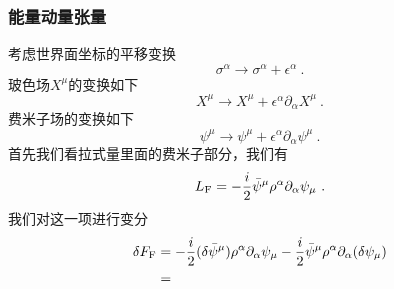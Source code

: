 \subsubsection{能量动量张量}
考虑世界面坐标的平移变换
\begin{equation}
\sigma^\alpha \rightarrow \sigma^\alpha + \epsilon^\alpha~.
\end{equation}
玻色场$X^\mu$的变换如下
\begin{equation}
X^\mu \rightarrow X^\mu + \epsilon^\alpha \partial_\alpha X^\mu ~.
\end{equation}
费米子场的变换如下
\begin{equation}
\psi^\mu \rightarrow \psi^\mu + \epsilon^\alpha \partial_\alpha \psi^\mu ~.
\end{equation}
首先我们看拉式量里面的费米子部分，我们有
\begin{equation}
L_{\rm F} = - \frac{i}{2} \bar\psi^\mu \rho^\alpha \partial_\alpha \psi_\mu ~.
\end{equation}
我们对这一项进行变分
\begin{equation}
\begin{aligned}
\delta F_{\rm F} & = - \frac{i}{2} (\delta \bar\psi^\mu) \rho^\alpha \partial_\alpha \psi_\mu - \frac{i}{2} \bar\psi^\mu \rho^\alpha \partial_\alpha (\delta \psi_\mu) \\
& = 
\end{aligned}
\end{equation}
































